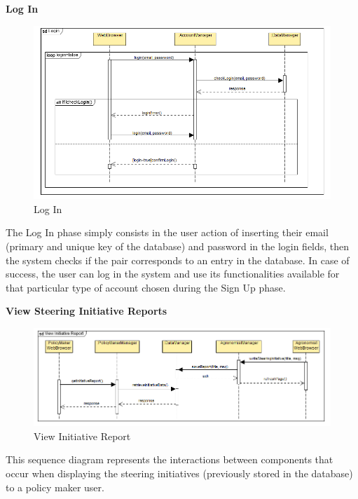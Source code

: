 \documentclass[table, 12pt]{article}
\begin{document}
\newpage
\textbf{Log In}
\begin{center}
    \begin{figure}[H]
        \includegraphics[scale=0.8, center]{assets/SequenceDiagram/Login.png}
        \caption{Log In}
        \label{fig: login}
    \end{figure}
\end{center}

The Log In phase simply consists in the user action of inserting their email (primary and unique key of the database) and password in the login fields, then the system checks if the pair corresponds to an entry in the database.
In case of success, the user can log in the system and use its functionalities available for that particular type of account chosen during the Sign Up phase.

\newpage
\textbf{View Steering Initiative Reports}
\begin{center}
    \begin{figure}[H]
        \includegraphics[scale=0.6, center]{assets/SequenceDiagram/ViewInitiativeReport.png}
        \caption{View Initiative Report}
        \label{fig: report}
    \end{figure}
\end{center}
This sequence diagram represents the interactions between components that occur when displaying the steering initiatives (previously stored in the database) to a policy maker user.
\end{document}
